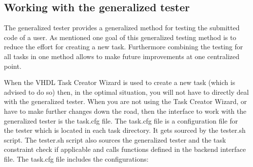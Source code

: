 \subsection{Working with the generalized tester} \label{sub:testercommon}

The generalized tester provides a generalized method for testing the submitted code of a user. As mentioned one goal of this generalized testing method is to reduce the effort for creating a new task. Furthermore combining the testing for all tasks in one method allows to make future improvements at one centralized point.

When the VHDL Task Creator Wizard is used to create a new task (which is advised to do so) then, in the optimal situation, you will not have to directly deal with the generalized tester. When you are not using the Task Creator Wizard, or have to make further changes down the road, then the interface to work with the generalized tester is the task.cfg file. The task.cfg file is a configuration file for the tester which is located in each task directory. It gets sourced by the tester.sh script. The tester.sh script also sources the generalized tester and the task constraint check if applicable and calls functions defined in the backend interface file. The task.cfg file includes the configurations:
